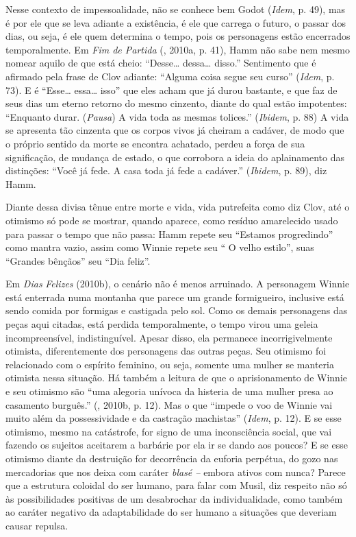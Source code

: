 {Nesse contexto de impessoalidade, não se conhece bem Godot (\emph{Idem},
p. 49), mas é por ele que se leva adiante a existência, é ele que
carrega o futuro, o passar dos dias, ou seja, é ele quem determina o
tempo, pois os personagens estão encerrados temporalmente. Em \emph{Fim
de Partida} (, 2010a, p. 41), Hamm não sabe nem mesmo nomear
aquilo de que está cheio: ``Desse\ldots{} dessa\ldots{} disso.'' Sentimento que é
afirmado pela frase de Clov adiante: ``Alguma coisa segue seu curso''
(\emph{Idem}, p. 73). E é ``Esse\ldots{} essa\ldots{} isso'' que eles acham que já
durou bastante, e que faz de seus dias um eterno retorno do mesmo
cinzento, diante do qual estão impotentes: ``Enquanto durar.
(\emph{Pausa}) A vida toda as mesmas tolices.'' (\emph{Ibidem}, p. 88) A
vida se apresenta tão cinzenta que os corpos vivos já cheiram a cadáver,
de modo que o próprio sentido da morte se encontra achatado, perdeu a
força de sua significação, de mudança de estado, o que corrobora a ideia
do aplainamento das distinções: ``Você já fede. A casa toda já fede a
cadáver.'' (\emph{Ibidem}, p. 89), diz Hamm.

Diante dessa divisa tênue entre morte e vida, vida putrefeita como diz
Clov, até o otimismo só pode se mostrar, quando aparece, como resíduo
amarelecido usado para passar o tempo que não passa: Hamm repete seu
``Estamos progredindo'' como mantra vazio, assim como Winnie repete seu
`` O velho estilo'', suas ``Grandes bênçãos'' seu ``Dia feliz''.

Em \emph{Dias} \emph{Felizes} (2010b), o cenário não é menos arruinado.
A personagem Winnie está enterrada numa montanha que parece um grande
formigueiro, inclusive está sendo comida por formigas e castigada pelo
sol. Como os demais personagens das peças aqui citadas, está perdida
temporalmente, o tempo virou uma geleia incompreensível, indistinguível.
Apesar disso, ela permanece incorrigivelmente otimista, diferentemente
dos personagens das outras peças. Seu otimismo foi relacionado com o
espírito feminino, ou seja, somente uma mulher se manteria otimista
nessa situação. Há também a leitura de que o aprisionamento de Winnie e
seu otimismo são ``uma alegoria unívoca da histeria de uma mulher presa
ao casamento burguês.'' (, 2010b, p. 12). Mas o que ``impede o
voo de Winnie vai muito além da possessividade e da castração
machistas'' (\emph{Idem}, p. 12). E se esse otimismo, mesmo na
catástrofe, for signo de uma inconsciência social, que vai fazendo os
sujeitos aceitarem a barbárie por ela ir se dando aos poucos? E se esse
otimismo diante da destruição for decorrência da euforia perpétua, do
gozo nas mercadorias que nos deixa com caráter \emph{blasé --} embora
ativos com nunca? Parece que a estrutura coloidal do ser humano, para
falar com Musil, diz respeito não só às possibilidades positivas de um
desabrochar da individualidade, como também ao caráter negativo da
adaptabilidade do ser humano a situações que deveriam causar repulsa.

}
